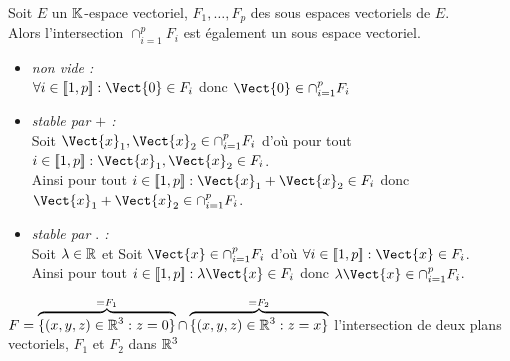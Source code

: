 \documentclass{book}
\begin{document}
\begin{Proposition}
Soit $E$ un $\mathbb{K} $-espace vectoriel, $F_1, \dots, F_p$ des sous espaces vectoriels de $E$.\\
Alors l'intersection $\cap_{i=1}^p F_i$ est également un sous espace vectoriel.
\end{Proposition}
\begin{Demonstration}
\begin{itemize}
\item \textit{non vide :}\\
$\forall i \in \Intf{1}{p}: \Vect{0}\in F_i$ donc $\Vect{0}\in \cap_{i=1}^p F_i$
\item \textit{stable par $+$ :}\\
Soit $\Vect{x}_1,\Vect{x}_2 \in \cap_{i=1}^p F_i $ d'où pour tout $i\in \Intf{1}{p}: \Vect{x}_1,\Vect{x}_2\in F_i$.\\
Ainsi pour tout $i \in \Intf{1}{p}: \Vect{x}_1+\Vect{x}_2 \in F_i$ donc $\Vect{x}_1+\Vect{x}_2\in \cap_{i=1}^p F_i$.
\item
  \textit{stable par $.$ :} \\
Soit $\lambda\in \mathbb{R}$ et Soit $\Vect{x}\in \cap_{i=1}^p F_i $ d'où $\forall i \in \Intf{1}{p}: \Vect{x}\in F_i$.\\
Ainsi pour tout $i \in \Intf{1}{p}: \lambda\Vect{x}\in F_i$ donc $\lambda \Vect{x}\in \cap_{i=1}^p F_i$.
\end{itemize}
\end{Demonstration}
\begin{Exemple}$F=\overbrace{\{(x,y,z)\in \mathbb{R}^3: z=0\}}^{=F_1}\cap \overbrace{\{(x,y,z)\in \mathbb{R}^3: z=x\}}^{=F_2} $  l'intersection de deux plans vectoriels, $F_1$ et $F_2$ dans $\mathbb{R} ^3$
\begin{center}
\end{center}
\end{Exemple}
\end{document}
